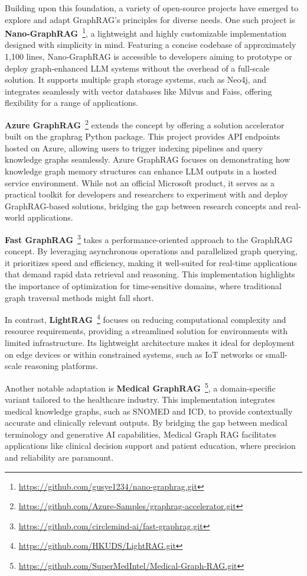 \documentclass[lettersize,journal]{IEEEtran}
\begin{document}
Building upon this foundation, a variety of open-source projects have emerged to explore and adapt GraphRAG's principles for diverse needs. One such project is \textbf{Nano-GraphRAG}~\footnote{\url{https://github.com/gusye1234/nano-graphrag.git}}, a lightweight and highly customizable implementation designed with simplicity in mind. Featuring a concise codebase of approximately 1,100 lines, Nano-GraphRAG is accessible to developers aiming to prototype or deploy graph-enhanced LLM systems without the overhead of a full-scale solution. It supports multiple graph storage systems, such as Neo4j, and integrates seamlessly with vector databases like Milvus and Faiss, offering flexibility for a range of applications.

\textbf{Azure GraphRAG}~\footnote{\url{https://github.com/Azure-Samples/graphrag-accelerator.git}} extends the concept by offering a solution accelerator built on the graphrag Python package. This project provides API endpoints hosted on Azure, allowing users to trigger indexing pipelines and query knowledge graphs seamlessly. Azure GraphRAG focuses on demonstrating how knowledge graph memory structures can enhance LLM outputs in a hosted service environment. While not an official Microsoft product, it serves as a practical toolkit for developers and researchers to experiment with and deploy GraphRAG-based solutions, bridging the gap between research concepts and real-world applications.


\textbf{Fast GraphRAG}~\footnote{\url{https://github.com/circlemind-ai/fast-graphrag.git}} takes a performance-oriented approach to the GraphRAG concept. By leveraging asynchronous operations and parallelized graph querying, it prioritizes speed and efficiency, making it well-suited for real-time applications that demand rapid data retrieval and reasoning. This implementation highlights the importance of optimization for time-sensitive domains, where traditional graph traversal methods might fall short.

In contrast, \textbf{LightRAG}~\footnote{\url{https://github.com/HKUDS/LightRAG.git}} focuses on reducing computational complexity and resource requirements, providing a streamlined solution for environments with limited infrastructure. Its lightweight architecture makes it ideal for deployment on edge devices or within constrained systems, such as IoT networks or small-scale reasoning platforms.

Another notable adaptation is \textbf{Medical GraphRAG}~\footnote{\url{https://github.com/SuperMedIntel/Medical-Graph-RAG.git}}, a domain-specific variant tailored to the healthcare industry. This implementation integrates medical knowledge graphs, such as SNOMED and ICD, to provide contextually accurate and clinically relevant outputs. By bridging the gap between medical terminology and generative AI capabilities, Medical Graph RAG facilitates applications like clinical decision support and patient education, where precision and reliability are paramount.
\end{document}
